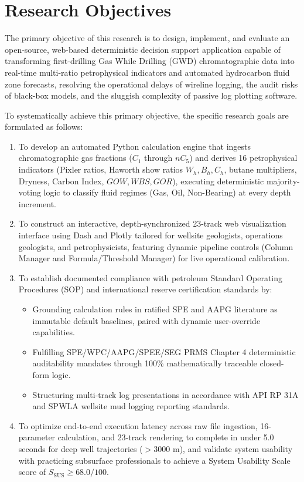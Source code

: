 \section{Research Objectives}

The primary objective of this research is to design, implement, and evaluate an open-source, web-based deterministic decision support application capable of transforming first-drilling Gas While Drilling (GWD) chromatographic data into real-time multi-ratio petrophysical indicators and automated hydrocarbon fluid zone forecasts, resolving the operational delays of wireline logging, the audit risks of black-box models, and the sluggish complexity of passive log plotting software.

To systematically achieve this primary objective, the specific research goals are formulated as follows:

\begin{enumerate}
    \item To develop an automated Python calculation engine that ingests chromatographic gas fractions ($C_1$ through $nC_5$) and derives 16 petrophysical indicators (Pixler ratios, Haworth show ratios $W_h, B_h, C_h$, butane multipliers, Dryness, Carbon Index, $GOW, WBS, GOR$), executing deterministic majority-voting logic to classify fluid regimes (Gas, Oil, Non-Bearing) at every depth increment.
    
    \item To construct an interactive, depth-synchronized 23-track web visualization interface using Dash and Plotly tailored for wellsite geologists, operations geologists, and petrophysicists, featuring dynamic pipeline controls (Column Manager and Formula/Threshold Manager) for live operational calibration.
    
    \item To establish documented compliance with petroleum Standard Operating Procedures (SOP) and international reserve certification standards by:
    \begin{itemize}
        \item Grounding calculation rules in ratified SPE and AAPG literature as immutable default baselines, paired with dynamic user-override capabilities.
        \item Fulfilling SPE/WPC/AAPG/SPEE/SEG PRMS Chapter 4 deterministic auditability mandates through 100\% mathematically traceable closed-form logic.
        \item Structuring multi-track log presentations in accordance with API RP 31A and SPWLA wellsite mud logging reporting standards.
    \end{itemize}
    
    \item To optimize end-to-end execution latency across raw file ingestion, 16-parameter calculation, and 23-track rendering to complete in under 5.0 seconds for deep well trajectories ($> 3000\text{ m}$), and validate system usability with practicing subsurface professionals to achieve a System Usability Scale score of $S_{\text{SUS}} \ge 68.0/100$.
\end{enumerate}

